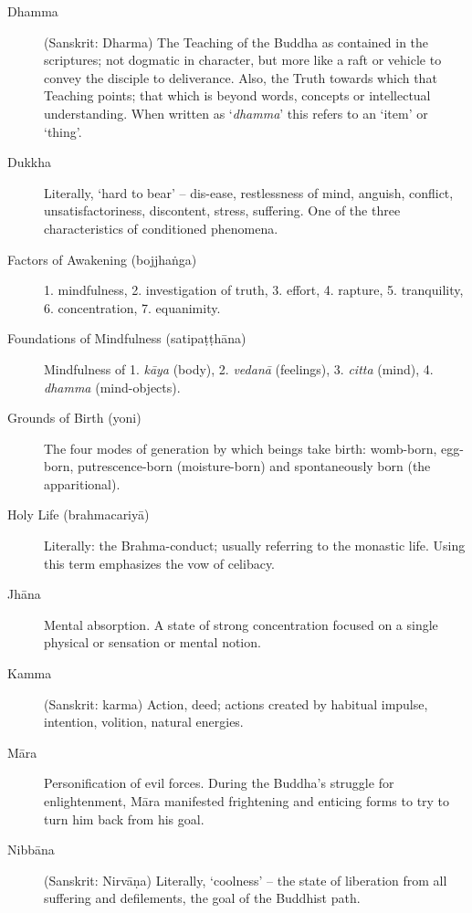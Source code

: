 \begin{description}
\item[Dhamma] (Sanskrit: Dharma) The Teaching of the Buddha as contained
  in the scriptures; not dogmatic in character, but more like a raft or
  vehicle to convey the disciple to deliverance. Also, the Truth towards
  which that Teaching points; that which is beyond words, concepts or
  intellectual understanding. When written as ‘\emph{dhamma}’ this
  refers to an ‘item’ or ‘thing’.

\item[Dukkha] Literally, ‘hard to bear’ – dis-ease, restlessness of
  mind, anguish, conflict, unsatisfactoriness, discontent, stress,
  suffering. One of the three characteristics of conditioned phenomena.

\item[Factors of Awakening (bojjhaṅga)] 1. mindfulness, 2. investigation
of truth, 3. effort, 4. rapture, 5. tranquility, 6. concentration, 7.
equanimity.

\item[Foundations of Mindfulness (satipaṭṭhāna)] Mindfulness of 1.
\emph{kāya} (body), 2. \emph{vedanā} (feelings), 3. \emph{citta} (mind),
4. \emph{dhamma} (mind-objects).

\item[Grounds of Birth (yoni)] The four modes of generation by which
  beings take birth: womb-born, egg-born, putrescence-born
  (moisture-born) and spontaneously born (the apparitional).

\item[Holy Life (brahmacariyā)] Literally: the Brahma-conduct; usually
  referring to the monastic life. Using this term emphasizes the vow of
  celibacy.

\item[Jhāna] Mental absorption. A state of strong concentration focused
  on a single physical or sensation or mental notion.

\item[Kamma] (Sanskrit: karma) Action, deed; actions created by habitual
  impulse, intention, volition, natural energies.

\item[Māra] Personification of evil forces. During the Buddha’s struggle
  for enlightenment, Māra manifested frightening and enticing forms to
  try to turn him back from his goal.

\item[Nibbāna] (Sanskrit: Nirvāṇa) Literally, ‘coolness’ – the state of
  liberation from all suffering and defilements, the goal of the
  Buddhist path.


\end{description}
